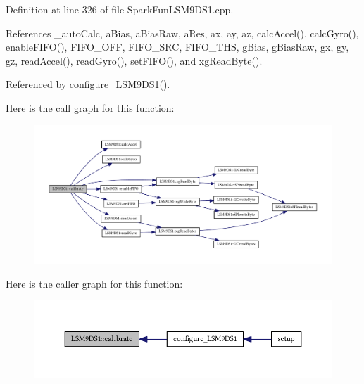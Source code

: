 Definition at line 326 of file Spark\+Fun\+L\+S\+M9\+D\+S1.\+cpp.



References \+\_\+auto\+Calc, a\+Bias, a\+Bias\+Raw, a\+Res, ax, ay, az, calc\+Accel(), calc\+Gyro(), enable\+F\+I\+F\+O(), F\+I\+F\+O\+\_\+\+O\+FF, F\+I\+F\+O\+\_\+\+S\+RC, F\+I\+F\+O\+\_\+\+T\+HS, g\+Bias, g\+Bias\+Raw, gx, gy, gz, read\+Accel(), read\+Gyro(), set\+F\+I\+F\+O(), and xg\+Read\+Byte().



Referenced by configure\+\_\+\+L\+S\+M9\+D\+S1().



Here is the call graph for this function\+:
\nopagebreak
\begin{figure}[H]
\begin{center}
\leavevmode
\includegraphics[width=350pt]{class_l_s_m9_d_s1_a97939cb15fcb7e33abcd6d3a9230d943_cgraph}
\end{center}
\end{figure}




Here is the caller graph for this function\+:\nopagebreak
\begin{figure}[H]
\begin{center}
\leavevmode
\includegraphics[width=350pt]{class_l_s_m9_d_s1_a97939cb15fcb7e33abcd6d3a9230d943_icgraph}
\end{center}
\end{figure}


